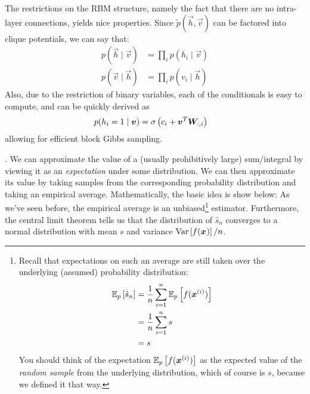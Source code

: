 \documentclass[11pt]{article}
\begin{document}
The restrictions on the RBM structure, namely the fact that there are no intra-layer connections, yields nice properties. Since $\widetilde p(\vec{h},\vec{v})$ can be factored into clique potentials, we can say that:
\begin{align}
	p(\vec{h} \mid \vec{v}) &= \prod_i p(h_i \mid \vec{v}) \\
	p(\vec{v} \mid \vec{h}) &= \prod_i p(v_i \mid \vec{h})
\end{align}
Also, due to the restriction of binary variables, each of the conditionals is easy to compute, and can be quickly derived as
\begin{align}
	p(h_i = 1 \mid \vec{v}) &= \sigma\left( c_i + \vec{v}^T\matr[:,i]{W} \right)
\end{align}
allowing for efficient block Gibbs sampling. 



%
% 

\p {}. We can approximate the value of a (usually prohibitively large) sum/integral by viewing it as an \textit{expectation} under some distribution. We can then approximate its value by taking samples from the corresponding probability distribution and taking an empirical average. Mathematically, the basic idea is show below:
As we've seen before, the empirical average is an unbiased\footnote{
	Recall that expectations on such an average are still taken over the underlying (assumed) probability distribution:
	\begin{align}
		\E[p]{\hat{s}_n} &= \frac{1}{n} \sum_{i = 1}^{n} \E[p]{f(\vec{x}^{(i)})} \\
		&= \frac{1}{n} \sum_{i = 1}^{n} s \\
		&= s
	\end{align}
	You should think of the expectation $\E[p]{f(\vec{x}^{(i)})}$ as the expected value of the \textit{random sample} from the underlying distribution, which of course is $s$, because we defined it that way. 
	} estimator. Furthermore, the central limit theorem tells us that the distribution of $\hat{s}_n$ converges to a normal distribution with mean $s$ and variance $\Var{f(\vec{x})}/n$. 
	
\end{document}
